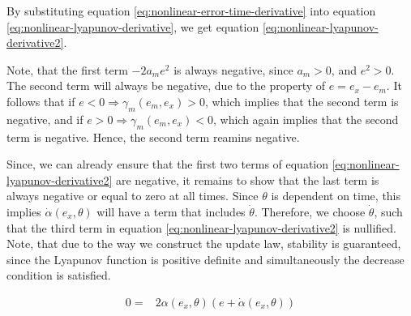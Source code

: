 By substituting equation \eqref{eq:nonlinear-error-time-derivative} into equation \eqref{eq:nonlinear-lyapunov-derivative}, we get equation \eqref{eq:nonlinear-lyapunov-derivative2}. 

Note, that the first term $-2a_me^2$ is always negative, since $a_m>0$, and $e^2 > 0$. The second term will always be negative, due to the property of $e=e_x-e_m$. It follows that if $e<0 \Rightarrow \gamma_m(e_m, e_x)>0$, which implies that the second term is negative, and if $e>0 \Rightarrow \gamma_m(e_m, e_x)<0$, which again implies that the second term is negative. Hence, the second term reamins negative.

Since, we can already ensure that the first two terms of equation \eqref{eq:nonlinear-lyapunov-derivative2} are negative, it remains to show that the last term is always negative or equal to zero at all times. Since $\theta$ is dependent on time, this implies $\dot \alpha(e_x, \theta)$ will have a term that includes $\dot \theta$. Therefore, we choose  $\dot \theta$, such that the third term in equation \eqref{eq:nonlinear-lyapunov-derivative2} is nullified. Note, that due to the way we construct the update law, stability is guaranteed, since the Lyapunov function is positive definite and simultaneously the decrease condition is satisfied.


\begin{equation}
    \begin{aligned}
        0 = & 2\alpha(e_x, \theta)(e +  \dot \alpha(e_x, \theta))
    \end{aligned}
\end{equation}

